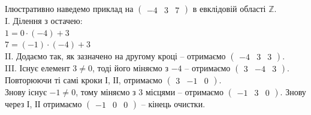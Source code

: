 \documentclass{math_library}
\begin{document}
\begin{example}
Ілюстративно наведемо приклад на $\begin{pmatrix}
-4 & 3 & 7
\end{pmatrix}$ в евклідовій області $\mathbb{Z}$.\\
I. Ділення з остачею:\\
$1 = 0 \cdot (-4) + 3$\\
$7 = (-1) \cdot (-4) + 3$\\
II. Додаємо так, як зазначено на другому кроці -- отримаємо $\begin{pmatrix}
-4 & 3 & 3
\end{pmatrix}$.\\
III. Існує елемент $3 \neq 0$, тоді його міняємо з $-4$ -- отримаємо  $\begin{pmatrix}
3 & -4 & 3
\end{pmatrix}$.\\
Повторюючи ті самі кроки І, ІІ, отримаємо $\begin{pmatrix}
3 & -1 & 0
\end{pmatrix}$.\\
Знову існує $-1 \neq 0$, тому міняємо з $3$ місцями -- отримаємо $\begin{pmatrix}
-1 & 3 & 0
\end{pmatrix}$. Знову через І, ІІ отримаємо $\begin{pmatrix}
-1 & 0 & 0
\end{pmatrix}$ -- кінець очистки.
\end{example}
\end{document}
